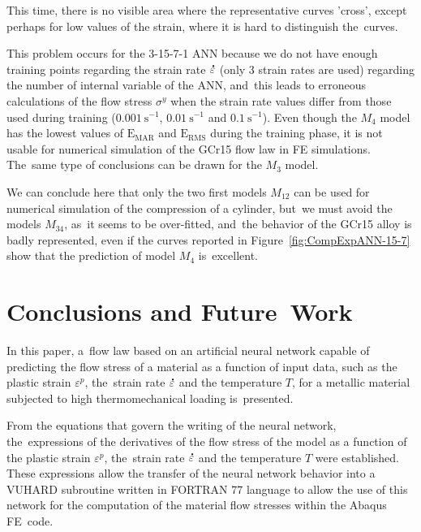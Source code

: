 \documentclass[algorithms,article,accept,pdftex,moreauthors]{Definitions/mdpi}
\DeclareRobustCommand{\mdot}[1]{\accentset{\mbox{\bfseries .}}{#1}}
\DeclareRobustCommand{\RMSE}{\text{E}_\text{RMS}}
\DeclareRobustCommand{\MARE}{\text{E}_\text{MAR}}
\DeclareRobustCommand{\ps}{\text{s}^{-1}}
\begin{document}
This time, there is no visible area where the representative curves 'cross', except perhaps for low values of the strain, where it is hard to distinguish the~curves.

This problem occurs for the 3-15-7-1 ANN because we do not have enough training points regarding the strain rate $\mdot\varepsilon$ (only 3 strain rates are used) regarding the number of internal variable of the ANN, and~this leads to erroneous calculations of the flow stress $\sigma^y$ when the strain rate values differ from those used during training ($0.001~\ps$, $0.01~\ps$ and $0.1~\ps$).
Even though the $M_4$ model has the lowest values of $\MARE$ and $\RMSE$ during the training phase, it is not usable for numerical simulation of the GCr15 flow law in FE simulations. The~same type of conclusions can be drawn for the $M_3$ model.

We can conclude here that only the two first models $M_{12}$ can be used for numerical simulation of the compression of a cylinder, but~we must avoid the models $M_{34}$, as~it seems to be over-fitted, and~the behavior of the GCr15 alloy is badly represented, even if the curves reported in Figure~\ref{fig:CompExpANN-15-7} show that the prediction of model $M_4$ is~excellent.

\section{Conclusions and Future~Work}\label{sec:Conclusions}

In this paper, a~flow law based on an artificial neural network capable of predicting the flow stress of a material as a function of input data, such as the plastic strain $\varepsilon^p$, the~strain rate $\mdot\varepsilon$ and the temperature $T$, for a metallic material subjected to high thermomechanical loading is~presented.

From the equations that govern the writing of the neural network, the~expressions of the derivatives of the flow stress of the model as a function of the plastic strain $\varepsilon^p$, the~strain rate $\mdot\varepsilon$ and the temperature $T$ were established.
These expressions allow the transfer of the neural network behavior into a VUHARD subroutine written in FORTRAN 77 language to allow the use of this network for the computation of the material flow stresses within the Abaqus FE~code.
\end{document}
